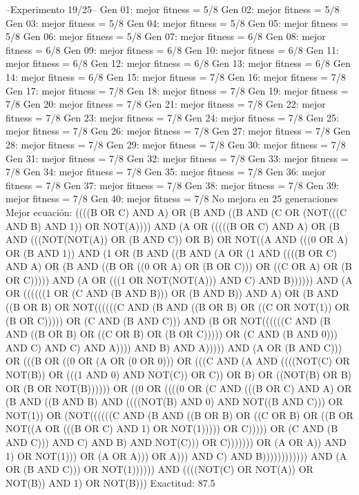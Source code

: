 --Experimento 
 19/25--
Gen 01: mejor fitness = 5/8
Gen 02: mejor fitness = 5/8
Gen 03: mejor fitness = 5/8
Gen 04: mejor fitness = 5/8
Gen 05: mejor fitness = 5/8
Gen 06: mejor fitness = 5/8
Gen 07: mejor fitness = 6/8
Gen 08: mejor fitness = 6/8
Gen 09: mejor fitness = 6/8
Gen 10: mejor fitness = 6/8
Gen 11: mejor fitness = 6/8
Gen 12: mejor fitness = 6/8
Gen 13: mejor fitness = 6/8
Gen 14: mejor fitness = 6/8
Gen 15: mejor fitness = 7/8
Gen 16: mejor fitness = 7/8
Gen 17: mejor fitness = 7/8
Gen 18: mejor fitness = 7/8
Gen 19: mejor fitness = 7/8
Gen 20: mejor fitness = 7/8
Gen 21: mejor fitness = 7/8
Gen 22: mejor fitness = 7/8
Gen 23: mejor fitness = 7/8
Gen 24: mejor fitness = 7/8
Gen 25: mejor fitness = 7/8
Gen 26: mejor fitness = 7/8
Gen 27: mejor fitness = 7/8
Gen 28: mejor fitness = 7/8
Gen 29: mejor fitness = 7/8
Gen 30: mejor fitness = 7/8
Gen 31: mejor fitness = 7/8
Gen 32: mejor fitness = 7/8
Gen 33: mejor fitness = 7/8
Gen 34: mejor fitness = 7/8
Gen 35: mejor fitness = 7/8
Gen 36: mejor fitness = 7/8
Gen 37: mejor fitness = 7/8
Gen 38: mejor fitness = 7/8
Gen 39: mejor fitness = 7/8
Gen 40: mejor fitness = 7/8
No mejora en 25 generaciones
Mejor ecuación: ((((B OR C) AND A) OR (B AND ((B AND (C OR (NOT(((C AND B) AND 1)) OR NOT(A)))) AND (A OR (((((B OR C) AND A) OR (B AND (((NOT(NOT(A)) OR (B AND C)) OR B) OR NOT((A AND (((0 OR A) OR (B AND 1)) AND (1 OR (B AND ((B AND (A OR (1 AND ((((B OR C) AND A) OR (B AND ((B OR ((0 OR A) OR (B OR C))) OR ((C OR A) OR (B OR C))))) AND (A OR (((1 OR NOT(NOT(A))) AND C) AND B)))))) AND (A OR ((((((1 OR (C AND (B AND B))) OR (B AND B)) AND A) OR (B AND ((B OR B) OR NOT((((((C AND (B AND ((B OR B) OR ((C OR NOT(1)) OR (B OR C))))) OR (C AND (B AND C))) AND (B OR NOT((((((C AND (B AND ((B OR B) OR ((C OR B) OR (B OR C))))) OR (C AND (B AND 0))) AND C) AND C) AND A)))) AND B) AND A))))) AND (A OR (B AND C))) OR (((B OR ((0 OR (A OR (0 OR 0))) OR (((C AND (A AND ((((NOT(C) OR NOT(B)) OR (((1 AND 0) AND NOT(C)) OR C)) OR B) OR ((NOT(B) OR B) OR (B OR NOT(B)))))) OR ((0 OR ((((0 OR (C AND (((B OR C) AND A) OR (B AND ((B AND B) AND ((((NOT(B) AND 0) AND NOT((B AND C))) OR NOT(1)) OR (NOT((((((C AND (B AND ((B OR B) OR ((C OR B) OR ((B OR NOT((A OR (((B OR C) AND 1) OR NOT(1))))) OR C))))) OR (C AND (B AND C))) AND C) AND B) AND NOT(C))) OR C))))))) OR (A OR A)) AND 1) OR NOT(1))) OR (A OR A))) OR A))) AND C) AND B)))))))))))) AND (A OR (B AND C))) OR NOT(1)))))) AND ((((NOT(C) OR NOT(A)) OR NOT(B)) AND 1) OR NOT(B)))
 Exactitud: 87.5%

